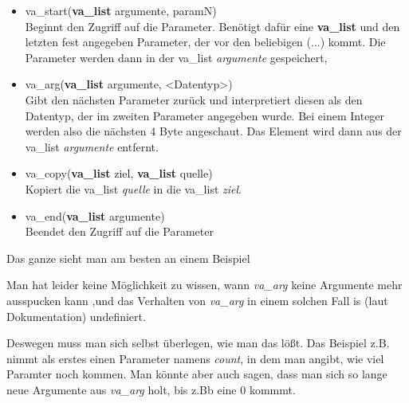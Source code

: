\documentclass[c_worksheet.tex]{subfiles}
\begin{document}
\begin{itemize}
	\item va\_start(\textbf{va\_list} argumente, paramN) \\
	Beginnt den Zugriff auf die Parameter. Benötigt dafür eine \textbf{va\_list} und den letzten fest angegeben Parameter, der vor den beliebigen (...) kommt. Die Parameter werden dann in der va\_list \emph{argumente} gespeichert,
	\item va\_arg(\textbf{va\_list} argumente, <Datentyp>) \\
	Gibt den nächsten Parameter zurück und interpretiert diesen als den Datentyp, der im zweiten Parameter angegeben wurde. Bei einem Integer werden also die nächsten 4 Byte angeschaut. Das Element wird dann aus der va\_list \emph{argumente} entfernt.
	\item va\_copy(\textbf{va\_list} ziel, \textbf{va\_list} quelle) \\
	Kopiert die va\_list \emph{quelle} in die va\_list \emph{ziel}.
	\item va\_end(\textbf{va\_list} argumente) \\
	Beendet den Zugriff auf die Parameter
\end{itemize}

Das ganze sieht man am besten an einem Beispiel



Man hat leider keine Möglichkeit zu wissen, wann \emph{va\_arg} keine Argumente mehr ausspucken kann ,und das Verhalten von \emph{va\_arg} in einem solchen Fall is (laut Dokumentation) undefiniert.

Deswegen muss man sich selbst überlegen, wie man das lößt. Das Beispiel z.B. nimmt als erstes einen Parameter namens \emph{count}, in dem  man angibt, wie viel Paramter noch kommen. Man könnte aber auch sagen, dass man sich so lange neue Argumente aus \emph{va\_arg} holt, bis z.Bb eine 0 kommmt.
\end{document}
